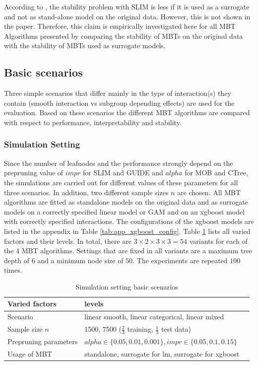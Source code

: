 According to \citep{Hu.2020}, the stability problem with SLIM is less if it is used as a surrogate and not as stand-alone model on the original data. However, this is not shown in the paper. Therefore, this claim is empirically investigated here for all MBT Algorithms presented by comparing the stability of MBTs on the original data with the stability of MBTs used as surrogate models.





\subsection{Basic scenarios}
Three simple scenarios that differ mainly in the type of interaction(s) they contain (smooth interaction vs subgroup depending effects) are used for the evaluation. Based on these scenarios the different MBT algorithms are compared with respect to performance, interpretability and stability.



\subsubsection{Simulation Setting}
Since the number of leafnodes and the performance strongly depend on the prepruning value of $impr$ for SLIM and GUIDE and $alpha$ for MOB and CTree, the simulations are carried out for different values of these parameters for all three scenarios. In addition, two different sample sizes $n$ are chosen. 
All MBT algorithms are fitted as standalone models on the original data and as surrogate models on a correctly specified linear model or GAM and on an xgboost model with correctly specified interactions. The configurations of the xgboost models are listed in the appendix in Table \ref{tab:app_xgboost_config}.
Table \ref{tab:simulation_setting} lists all varied factors and their levels. In total, there are $3 \times 2 \times 3 \times 3 = 54$ variants for each of the 4 MBT algorithms.
Settings that are fixed in all variants are a  maximum tree depth of $6$ and a minimum node size of $50$.
The experiments are repeated $100$ times.

\begin{table}[!htb] 
\centering \small
\begin{tabular}[t]{lll}
\hline
Varied factors & levels \\
\hline
Scenario  & linear smooth, linear categorical, linear mixed\\
Sample size $n$  & 1500, 7500 ($\frac{2}{3}$  training, $\frac{1}{3}$ test data)\\
Prepruning parameters   & $alpha \in \{0.05,0.01,0.001\}, impr \in \{0.05,0.1,0.15\}$ \\
Usage of MBT  & standalone, surrogate for lm, surrogate for xgboost \\ 
\hline
\end{tabular}
\caption{Simulation setting basic scenarios}
\label{tab:simulation_setting}
\end{table}

